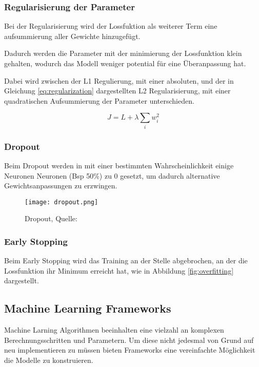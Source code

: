 \subsubsection{Regularisierung der Parameter}

Bei der Regularisierung wird der Lossfuktion als weiterer Term
eine aufsummierung aller Gewichte hinzugefügt.

Dadurch werden die Parameter mit der minimierung der
Lossfunktion klein gehalten, wodurch das Modell weniger
potential für eine Überanpassung hat.

Dabei wird zwischen der L1 Regulierung, mit einer
absoluten, und der in Gleichung \ref{eq:regularization}
dargestellten L2 Regularisierung, mit einer 
quadratischen Aufsummierung der 
Parameter unterschieden.

\begin{equation}
    \label{eq:regularization}
    J = L + \lambda \sum_{i} w_{i}^{2}
\end{equation}

\subsubsection{Dropout}
Beim Dropout werden in mit einer bestimmten Wahrscheinlichkeit 
einige Neuronen Neuronen (Bsp 50\%) zu 0 gesetzt, um 
dadurch alternative Gewichtsanpassungen zu erzwingen.

\begin{figure}[H]
    \centering
    \texttt{[image: dropout.png]}
    \caption{Dropout, Quelle: \cite{maksutovDeepStudyNot2018}}
    \label{fig:dropout}
\end{figure}


\subsubsection{Early Stopping}
Beim Early Stopping wird das Training an der 
Stelle abgebrochen, an der die Lossfunktion ihr 
Minimum erreicht hat, wie in Abbildung \ref{fig:overfitting}
dargestellt.



\subsection{Machine Learning Frameworks}

Machine Larning Algorithmen beeinhalten eine vielzahl an komplexen
Berechnungsschritten und Parametern. Um diese nicht jedesmal 
von Grund auf neu implementieren zu müssen bieten 
Frameworks eine vereinfachte Möglichkeit die Modelle zu konstruieren.

